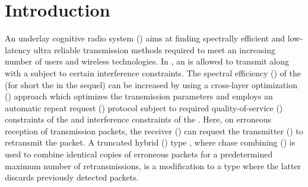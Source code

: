 \section{Introduction}
\label{sec:1}
An underlay cognitive radio system (\myUCRS{}) aims at finding spectrally efficient and low-latency ultra reliable transmission methods required to meet an increasing number of users and wireless technologies. In \myUCRS{}, an \mySU{} is allowed to transmit along with a \myPU{} subject to certain interference constraints. The spectral efficiency (\mySE{}) of the \mySU{} (for short the \mySE{} in the sequel) can be increased by using a cross-layer optimization (\myCLO{}) approach which optimizes the \mySU{} transmission parameters and employs an automatic repeat request (\myARQ{}) protocol subject to required quality-of-service (\myQoS{}) constraints of the \mySU{} and interference constraints of the \myPU{}. Here, on erroneous reception of transmission packets, the \mySU{} receiver (\myRX{}) can request the \mySU{} transmitter (\myTX{}) to retransmit the packet. A truncated hybrid \myARQ{} (\myTHARQ{}) type \myII{}, where chase combining (\myCC{}) is used to combine identical copies of erroneous packets for a predetermined maximum number of retransmissions, is a modification to a \myTHARQ{} type \myI{} where the latter discards previously detected packets.

